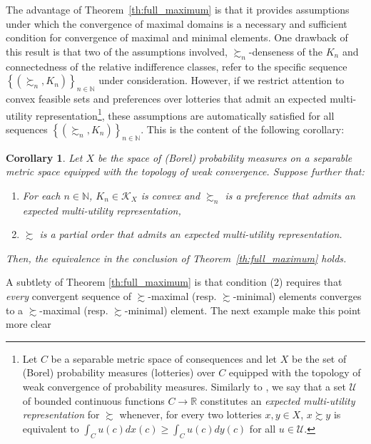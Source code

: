 \documentclass[12pt, oneside]{amsart}
\newtheorem{corollary}{Corollary}
\theoremstyle{definition}
\begin{document}
The advantage of Theorem~\ref{th:full_maximum} is that it provides assumptions under which the convergence of maximal domains is a necessary and sufficient condition for convergence of maximal and minimal elements. One drawback of this result is that two of the assumptions involved, $\succsim_n$-denseness of the $K_n$ and connectedness of the relative indifference classes, refer to the specific sequence $\left\{\left(\succsim_n, K_n\right)\right\}_{n \in\mathbb{N}}$ under consideration. However, if we restrict attention to convex feasible sets and preferences over lotteries that admit an expected multi-utility representation\footnote{Let $C$ be a separable metric space of consequences and let $X$ be the set of (Borel) probability measures (lotteries) over $C$ equipped with the topology of weak convergence of probability measures. Similarly to \citet*{Dubra2004}, we say that a set $\mathcal{U}$ of bounded continuous functions $C \to \mathbb{R}$ constitutes an \textit{expected multi-utility representation} for $\succsim$ whenever, for every two lotteries $x,y \in X$, $x \succsim y$ is equivalent to $\int_C u(c) dx(c) \geq \int_C u(c)dy(c)$ for all $u \in \mathcal{U}$.}, these assumptions are automatically satisfied for all sequences $\left\{\left(\succsim_n, K_n\right)\right\}_{n \in\mathbb{N}}$. This is the content of the following corollary:

\begin{corollary}
\label{cor:EMU}
Let $X$ be the space of (Borel) probability measures on a separable metric space equipped with the topology of weak convergence. Suppose further that:
\begin{enumerate}
\item For each $n \in \mathbb{N}$, $K_n \in \mathcal{K}_X$ is convex and $\succsim_n$ is a preference that admits an expected multi-utility representation,
\item $\succsim$ is a partial order that admits an expected multi-utility representation.
\end{enumerate}
Then, the equivalence in the conclusion of Theorem~\ref{th:full_maximum} holds.
\end{corollary}



A subtlety of Theorem \ref{th:full_maximum} is that condition (2) requires that \textit{every} convergent sequence of $\succsim$-maximal (resp. $\succsim$-minimal) elements converges to a $\succsim$-maximal (resp. $\succsim$-minimal) element. The next example make this point more clear
\end{document}
